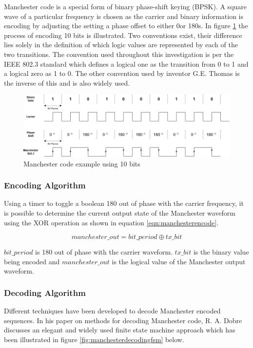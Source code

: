 Manchester code is a special form of binary phase-shift keying (BPSK). A square wave of a particular frequency is chosen as the carrier and binary information is encoding by adjusting the setting a phase offset to either 0\degree or 180\degree s. In figure \ref{fig:manchesterencoding} the process of encoding 10 bits is illustrated. Two conventions exist, their difference lies solely in the definition of which logic values are represented by each of the two transitions. The convention used throughout this investigation is per the IEEE 802.3 standard which defines a logical one as the transition from 0 to 1 and a logical zero as 1 to 0. The other convention used by inventor G.E. Thomas is the inverse of this and is also widely used.\\

\begin{figure}[H]
	\centering
	\includegraphics[width=0.7\linewidth]{figures/litreview/manchester_encoding}
	\caption{Manchester code example using 10 bits}
	\label{fig:manchesterencoding}
\end{figure}

\subsubsection{Encoding Algorithm}

Using a timer to toggle a boolean 180\textdegree{} out of phase with the carrier frequency, it is possible to determine the current output state of the Manchester waveform using the XOR operation as shown in equation \ref{eqn:manchesterencode}.

\begin{equation}
	\label{eqn:manchesterencode}
	manchester\_out = bit\_period \oplus tx\_bit
\end{equation}

$bit\_period$ is 180\textdegree{} out of phase with the carrier waveform. $tx\_bit$ is the binary value being encoded and $manchester\_out$ is the logical value of the Manchester output waveform.


\subsubsection{Decoding Algorithm}
Different techniques have been developed to decode Manchester encoded sequences. In his paper on methods for decoding Manchester code, R. A. Dobre discusses an elegant and widely used finite state machine approach which has been illustrated in figure \ref{fig:manchesterdecodingfsm} below. \cite{Dobre2014}

